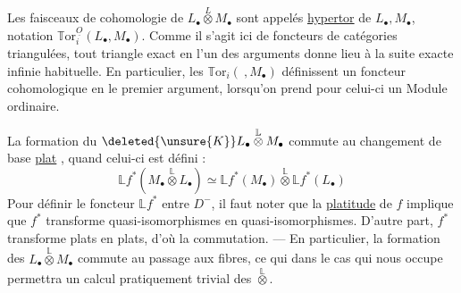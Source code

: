 Les  faisceaux de cohomologie de $L_{\bullet}\overset{L}{\otimes}M_{\bullet}$ sont appelés \uline{hypertor} de $L_{\bullet},M_{\bullet}$, notation $\mathbb T\mathrm{or}_i^{\underline O}(L_{\bullet},M_{\bullet})$.  Comme il s'agit ici de foncteurs  de catégories triangulées, tout triangle exact en l'un des arguments donne lieu à la suite exacte infinie habituelle. En particulier, les $\mathbb T\mathrm{or}_i(\ ,M_{\bullet})$ définissent un foncteur cohomologique en le premier argument, lorsqu'on prend pour celui-ci un Module ordinaire.

La formation du $\deleted{\unsure{K}}L_{\bullet}\overset{\mathbb L}{\otimes}M_{\bullet}$ commute au changement de base \uline{plat} , quand celui-ci est défini  : \deleted{\unsure{[mais alors}}
\[
\boxed{\mathbb L f^*(M_{\bullet}\overset{\mathbb L}{\otimes}L_{\bullet})\simeq\mathbb L f^*(M_{\bullet})\overset{\mathbb L}{\otimes}\mathbb L f^*(L_{\bullet})}
\]
Pour définir le foncteur  $\mathbb L f^*$ entre $D^-$, il faut noter que la \uline{platitude} de $f$ implique que $f^*$ transforme quasi-isomorphismes en quasi-isomorphismes. D'autre part, $f^*$ transforme plats en plats, d'où la commutation.
--- En particulier, la formation des $L_{\bullet}\overset{\mathbb L}{\otimes}M_{\bullet}$ commute au passage aux fibres, ce qui dans le cas qui nous occupe permettra  un calcul pratiquement trivial des $\overset{\mathbb L}{\otimes}$.
